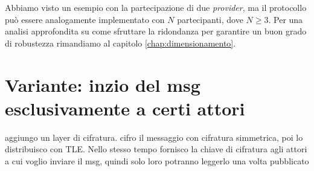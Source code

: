 Abbiamo visto un esempio con la partecipazione di due \textit{provider},
ma il protocollo
può essere analogamente implementato con $ N $ partecipanti, dove $ N \geq 3 $.
Per una analisi approfondita su come sfruttare la ridondanza per
garantire un buon grado di robustezza rimandiamo al capitolo
\ref{chap:dimensionamento}.

\section{Variante: inzio del msg esclusivamente a certi attori}
aggiungo un layer di cifratura.
cifro il messaggio con cifratura simmetrica, poi lo distribuisco con TLE. Nello stesso tempo fornisco
la chiave di cifratura agli attori a cui voglio inviare il msg, 
quindi solo loro potranno leggerlo una volta pubblicato

